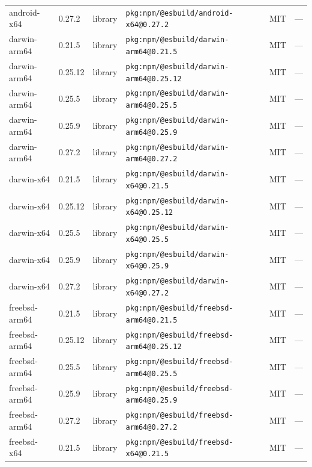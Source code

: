 \documentclass[11pt,a4paper]{article}
\begin{document}
\begin{longtable}{|p{4cm}|p{2cm}|p{1.6cm}|p{5cm}|p{1.5cm}|p{3.5cm}|}
\raggedright android-x64 & 0.27.2 & library & \small\texttt{pkg:npm/@esbuild/android-x64@0.27.2} & MIT & \small — \\
\raggedright darwin-arm64 & 0.21.5 & library & \small\texttt{pkg:npm/@esbuild/darwin-arm64@0.21.5} & MIT & \small — \\
\raggedright darwin-arm64 & 0.25.12 & library & \small\texttt{pkg:npm/@esbuild/darwin-arm64@0.25.12} & MIT & \small — \\
\raggedright darwin-arm64 & 0.25.5 & library & \small\texttt{pkg:npm/@esbuild/darwin-arm64@0.25.5} & MIT & \small — \\
\raggedright darwin-arm64 & 0.25.9 & library & \small\texttt{pkg:npm/@esbuild/darwin-arm64@0.25.9} & MIT & \small — \\
\raggedright darwin-arm64 & 0.27.2 & library & \small\texttt{pkg:npm/@esbuild/darwin-arm64@0.27.2} & MIT & \small — \\
\raggedright darwin-x64 & 0.21.5 & library & \small\texttt{pkg:npm/@esbuild/darwin-x64@0.21.5} & MIT & \small — \\
\raggedright darwin-x64 & 0.25.12 & library & \small\texttt{pkg:npm/@esbuild/darwin-x64@0.25.12} & MIT & \small — \\
\raggedright darwin-x64 & 0.25.5 & library & \small\texttt{pkg:npm/@esbuild/darwin-x64@0.25.5} & MIT & \small — \\
\raggedright darwin-x64 & 0.25.9 & library & \small\texttt{pkg:npm/@esbuild/darwin-x64@0.25.9} & MIT & \small — \\
\raggedright darwin-x64 & 0.27.2 & library & \small\texttt{pkg:npm/@esbuild/darwin-x64@0.27.2} & MIT & \small — \\
\raggedright freebsd-arm64 & 0.21.5 & library & \small\texttt{pkg:npm/@esbuild/freebsd-arm64@0.21.5} & MIT & \small — \\
\raggedright freebsd-arm64 & 0.25.12 & library & \small\texttt{pkg:npm/@esbuild/freebsd-arm64@0.25.12} & MIT & \small — \\
\raggedright freebsd-arm64 & 0.25.5 & library & \small\texttt{pkg:npm/@esbuild/freebsd-arm64@0.25.5} & MIT & \small — \\
\raggedright freebsd-arm64 & 0.25.9 & library & \small\texttt{pkg:npm/@esbuild/freebsd-arm64@0.25.9} & MIT & \small — \\
\raggedright freebsd-arm64 & 0.27.2 & library & \small\texttt{pkg:npm/@esbuild/freebsd-arm64@0.27.2} & MIT & \small — \\
\raggedright freebsd-x64 & 0.21.5 & library & \small\texttt{pkg:npm/@esbuild/freebsd-x64@0.21.5} & MIT & \small — \\

\end{longtable}
\end{document}
